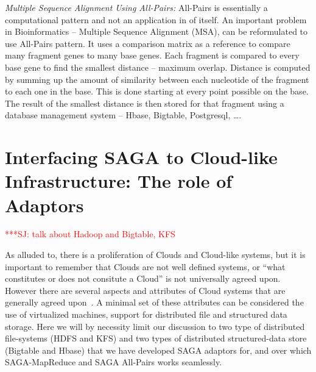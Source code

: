 \documentclass[conference,final]{IEEEtran}
\newcommand{\jhanote}[1]{ {\textcolor{red} { ***SJ: #1 }}}
\newcommand{\jhanote}[1]{}
\newcommand{\sagamapreduce }{SAGA-MapReduce }
\begin{document}
{\it Multiple Sequence Alignment Using All-Pairs:} All-Pairs is
essentially a computational pattern and not an application in of
itself. An important problem in Bioinformatics -- Multiple Sequence
Alignment (MSA), can be reformulated to use All-Pairs pattern. It uses
a comparison matrix as a reference to compare many fragment genes to
many base genes.  Each fragment is compared to every base gene to find
the smallest distance -- maximum overlap.  Distance is computed by
summing up the amount of similarity between each nucleotide of the
fragment to each one in the base.  This is done starting at every
point possible on the base. The result of the smallest distance is
then stored for that fragment using a database management system --
Hbase, Bigtable, Postgresql, \ldots.


\section{Interfacing SAGA to Cloud-like Infrastructure: The role of
  Adaptors}

\jhanote{talk about Hadoop and Bigtable, KFS}

As alluded to, there is a proliferation of Clouds and Cloud-like
systems, but it is important to remember that Clouds are not well
defined systems, or ``what constitutes or does not consitute a Cloud''
is not universally agreed upon.  However there are several aspects and
attributes of Cloud systems that are generally agreed
upon~\cite{buyya_hpcc}. A minimal set of these attributes can be
considered the use of virtualized machines, support for distributed
file and structured data storage.  Here we will by necessity limit our
discussion to two type of distributed file-systems (HDFS and KFS) and
two types of distributed structured-data store (Bigtable and Hbase)
that we have developed SAGA adaptors for, and over which
\sagamapreduce and SAGA All-Pairs works seamlessly.



\end{document}

